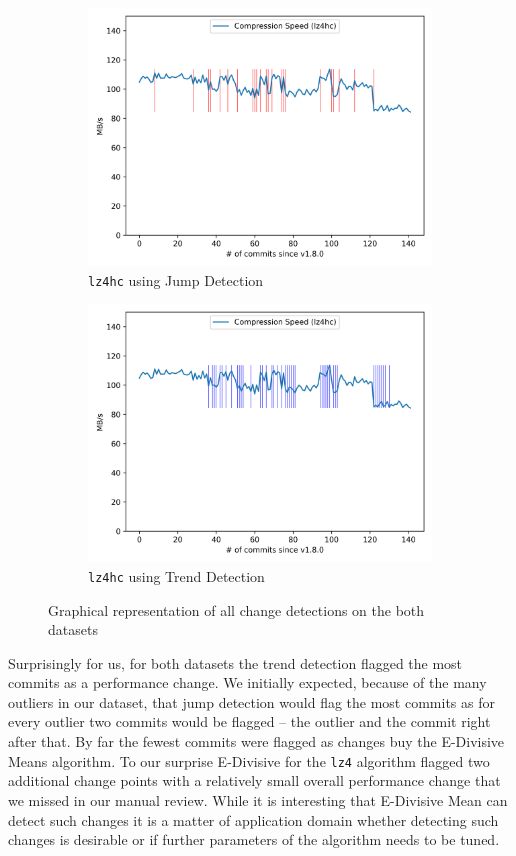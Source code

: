 \documentclass[	runningheads,
				a4paper]{llncs}
\begin{document}
\begin{figure}[ht!]
\begin{subfigure}[b]{0.3\textwidth}
		\includegraphics[width=\textwidth]{graph/lz4hc_commit_jump}
		\caption{\texttt{lz4hc} using Jump Detection}
	\end{subfigure}
	\begin{subfigure}[b]{0.3\textwidth}
		\includegraphics[width=\textwidth]{graph/lz4hc_commit_trend}
		\caption{\texttt{lz4hc} using Trend Detection}
	\end{subfigure}
	\caption{Graphical representation of all change detections on the both datasets}
	\label{fig:perf_commit_cp}
\end{figure}

Surprisingly for us, for both datasets the trend detection flagged the most commits as a performance change. We initially expected, because of the many outliers in our dataset, that jump detection would flag the most commits as for every outlier two commits would be flagged -- the outlier and the commit right after that. By far the fewest commits were flagged as changes buy the E-Divisive Means algorithm. To our surprise E-Divisive for the \texttt{lz4} algorithm flagged two additional change points with a relatively small overall performance change that we missed in our manual review. While it is interesting that E-Divisive Mean can detect such changes it is a matter of application domain whether detecting such changes is desirable or if further parameters of the algorithm needs to be tuned.
\end{document}
